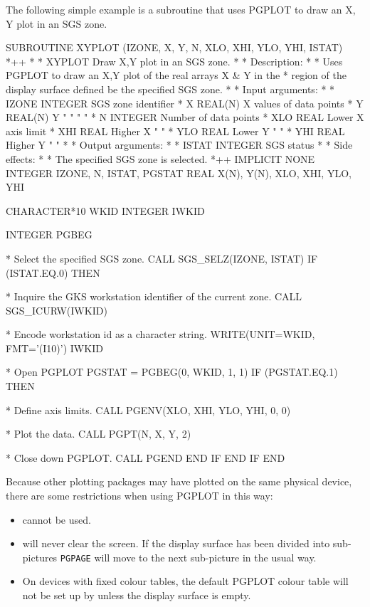 \documentclass[twoside,11pt,nolof]{starlink}
\begin{document}
The following simple example is a subroutine that uses PGPLOT to draw an X, Y
plot in an SGS zone.
\begin{small}
\begin{terminalv}
     SUBROUTINE XYPLOT (IZONE, X, Y, N, XLO, XHI, YLO, YHI, ISTAT)
*++
*
*   XYPLOT   Draw X,Y plot in an SGS zone.
*
*   Description:
*
*      Uses PGPLOT to draw an X,Y plot of the real arrays X & Y in the
*      region of the display surface defined be the specified SGS zone.
*
*   Input arguments:
*
*      IZONE    INTEGER         SGS zone identifier
*      X        REAL(N)         X values of data points
*      Y        REAL(N)         Y   "    "    "    "
*      N        INTEGER         Number of data points
*      XLO      REAL            Lower X axis limit
*      XHI      REAL            Higher X  "    "
*      YLO      REAL            Lower Y  "     "
*      YHI      REAL            Higher Y  "    "
*
*   Output arguments:
*
*      ISTAT    INTEGER         SGS status
*
*   Side effects:
*
*      The specified SGS zone is selected.
*++
     IMPLICIT NONE
     INTEGER  IZONE, N, ISTAT, PGSTAT
     REAL     X(N), Y(N), XLO, XHI, YLO, YHI

     CHARACTER*10 WKID
     INTEGER IWKID

     INTEGER PGBEG


*  Select the specified SGS zone.
     CALL SGS_SELZ(IZONE, ISTAT)
     IF (ISTAT.EQ.0) THEN

*     Inquire the GKS workstation identifier of the current zone.
        CALL SGS_ICURW(IWKID)

*     Encode workstation id as a character string.
        WRITE(UNIT=WKID, FMT='(I10)') IWKID

*     Open PGPLOT
        PGSTAT = PGBEG(0, WKID, 1, 1)
        IF (PGSTAT.EQ.1) THEN

*     Define axis limits.
           CALL PGENV(XLO, XHI, YLO, YHI, 0, 0)

*     Plot the data.
           CALL PGPT(N, X, Y, 2)

*     Close down PGPLOT.
           CALL PGEND
        END IF
     END IF
     END
\end{terminalv}
\end{small}

Because other plotting packages may have plotted on the same physical device,
there are some restrictions when using PGPLOT in this way:

\begin{itemize}
\item {} cannot be used.

\item {} will never clear the
screen.  If the display surface has been divided into sub-pictures
\texttt{PGPAGE} will move to the next sub-picture in the usual way.

\item On devices with fixed colour tables, the default PGPLOT colour
table will not be set up by  unless the
display surface is empty.

\end{itemize}
\end{document}
